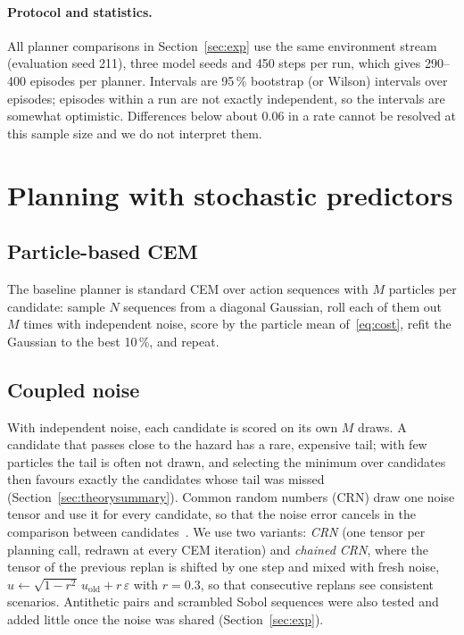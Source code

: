 \documentclass[preprint,12pt]{elsarticle}
\begin{document}
\paragraph{Protocol and statistics.}
All planner comparisons in Section~\ref{sec:exp} use the same environment stream (evaluation seed 211), three model seeds and 450 steps per run, which gives 290--400 episodes per planner.
Intervals are 95\,\% bootstrap (or Wilson) intervals over episodes; episodes within a run are not exactly independent, so the intervals are somewhat optimistic.
Differences below about 0.06 in a rate cannot be resolved at this sample size and we do not interpret them.

\section{Planning with stochastic predictors}\label{sec:methods}

\subsection{Particle-based CEM}\label{sec:pcem}
The baseline planner is standard CEM over action sequences with $M$ particles per candidate: sample $N$ sequences from a diagonal Gaussian, roll each of them out $M$ times with independent noise, score by the particle mean of~\eqref{eq:cost}, refit the Gaussian to the best 10\,\%, and repeat.

\subsection{Coupled noise}\label{sec:crn}
With independent noise, each candidate is scored on its own $M$ draws.
A candidate that passes close to the hazard has a rare, expensive tail; with few particles the tail is often not drawn, and selecting the minimum over candidates then favours exactly the candidates whose tail was missed (Section~\ref{sec:theorysummary}).
Common random numbers (CRN) draw one noise tensor and use it for every candidate, so that the noise error cancels in the comparison between candidates~\cite{glasserman1992crn}.
We use two variants: \emph{CRN} (one tensor per planning call, redrawn at every CEM iteration) and \emph{chained CRN}, where the tensor of the previous replan is shifted by one step and mixed with fresh noise, $u\leftarrow\sqrt{1-r^2}\,u_{\mathrm{old}}+r\,\varepsilon$ with $r=0.3$, so that consecutive replans see consistent scenarios.
Antithetic pairs and scrambled Sobol sequences were also tested and added little once the noise was shared (Section~\ref{sec:exp}).
\end{document}
